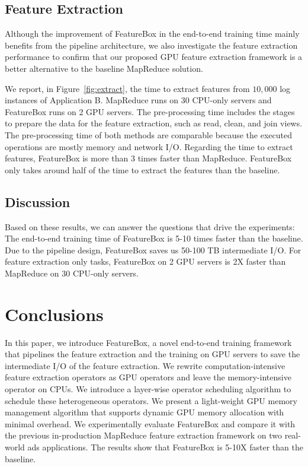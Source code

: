 \documentclass[conference]{IEEEtran}
\begin{document}
\subsection{Feature Extraction}
Although the improvement of FeatureBox in the end-to-end training time mainly benefits from the pipeline architecture, we also investigate the feature extraction performance to confirm that our proposed GPU feature extraction framework is a better alternative to the baseline MapReduce solution. 

We report, in Figure~\ref{fig:extract}, the time to extract features from $10,000$ log instances of Application B. MapReduce runs on 30 CPU-only servers and FeatureBox runs on 2 GPU servers. The pre-processing time includes the stages to prepare the data for the feature extraction, such as read, clean, and join views. The pre-processing time of both methods are comparable because the executed operations are mostly memory and network I/O. Regarding the time to extract features, FeatureBox is more than 3 times faster than MapReduce. FeatureBox only takes around half of the time to extract the features than the baseline.

\subsection{Discussion}
Based on these results, we can answer the questions that drive the experiments: The end-to-end training time of FeatureBox is 5-10 times faster than the baseline. Due to the pipeline design, FeatureBox saves us 50-100 TB intermediate I/O. For feature extraction only tasks, FeatureBox on 2 GPU servers is 2X faster than MapReduce on 30 CPU-only servers.


\section{Conclusions}
In this paper, we introduce FeatureBox, a novel end-to-end training framework that pipelines the feature extraction and the training on GPU servers to save the intermediate I/O of the feature extraction. We rewrite computation-intensive feature extraction operators as GPU operators and leave the memory-intensive operator on CPUs. We introduce a layer-wise operator scheduling algorithm to schedule these heterogeneous operators. We present a light-weight GPU memory management algorithm that supports dynamic GPU memory allocation with minimal overhead. We experimentally evaluate FeatureBox and compare it with the previous in-production MapReduce feature extraction framework on two real-world ads applications. The results show that FeatureBox is 5-10X faster than the baseline.

\clearpage


\end{document}
